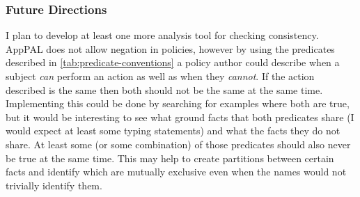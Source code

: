 \documentclass[a4paper]{scrartcl}
\begin{document}



\subsubsection*{Future Directions}

I plan to develop at least one more analysis tool for checking consistency.
AppPAL does not allow negation in policies, however by using the predicates
described in \autoref{tab:predicate-conventions} a policy author could describe
when a subject \emph{can} perform an action as well as when they \emph{cannot}.
If the action described is the same then both should not be the same at the same
time.  Implementing this could be done by searching for examples where both are
true, but it would be interesting to see what ground facts that both
predicates share (I would expect at least some typing statements) and
what the facts they do not share.  At least some (or some combination) of those
predicates should also never be true at the same time.  This may help to create
partitions between certain facts and identify which are mutually exclusive even
when the names would not trivially identify them.
\end{document}
